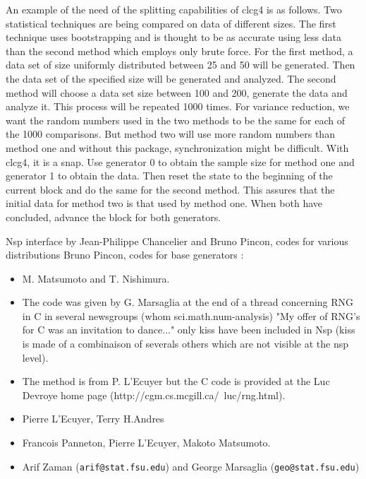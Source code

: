 An example of  the  need of the splitting capabilities of clcg4 is as  follows. 
Two statistical techniques are being compared on  data of  different sizes. The first 
technique uses   bootstrapping  and is   thought to   be  as accurate using less data   
than the second method   which  employs only brute force.  For the first method, a data
set of size uniformly distributed between 25 and 50 will be generated.  Then the data set  
of the specified size will be generated and analyzed.  The second method will  choose a 
data set size between 100 and 200, generate the data  and analyze it.  This process will 
be repeated 1000 times.  For  variance reduction, we  want the  random numbers  used in the 
two methods to be the  same for each of  the 1000 comparisons.  But method two will  use more
random  numbers than   method one and  without this package, synchronization might be difficult.  
With clcg4, it is a snap.  Use generator 0 to obtain  the sample size for  method one and 
generator 1  to obtain the  data.  Then reset the state to the beginning  of the current  block
and do the same  for the second method.  This assures that the initial data  for method two is 
that used by  method  one.  When both  have concluded,  advance the block for both generators.


\begin{manseealso}
\end{manseealso}


\begin{authors}

  Nsp interface by Jean-Philippe Chancelier and Bruno Pincon, codes for
  various distributions Bruno Pincon, codes for base generators :
\begin{itemize}
  \item {} 
  M. Matsumoto and  T. Nishimura.
  
  \item {} 
  The code was given by G. Marsaglia at the end of a thread concerning RNG in C in several 
  newsgroups (whom sci.math.num-analysis) "My offer of  RNG's for C was an invitation 
  to dance..." only kiss have been included in Nsp (kiss is made of a combinaison of 
  severals others which are not visible at the nsp level).
  
  \item {} 
  The method is from P. L'Ecuyer but the C code is provided at the Luc  Devroye home page 
  (http://cgm.cs.mcgill.ca/~luc/rng.html).
  
  \item {} 
  Pierre L'Ecuyer, Terry H.Andres
  
  \item {} 
  Francois Panneton, Pierre L'Ecuyer, Makoto Matsumoto.
   
  \item {} 
  Arif Zaman (\verb+arif@stat.fsu.edu+) and George Marsaglia (\verb+geo@stat.fsu.edu+)
\end{itemize}
\end{authors}

